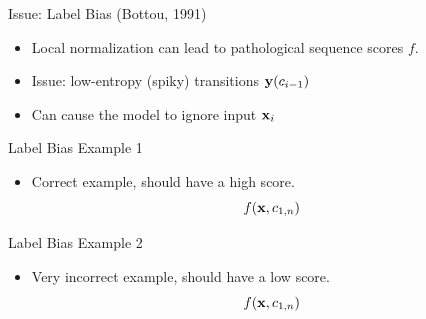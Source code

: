 \documentclass{beamer}
\def\LatticeB{
    \matrix (network)
    [matrix of nodes,
    nodes in empty cells,
    ampersand replacement=\&,
    column sep={1cm},
    row sep={0.1cm},
    nodes={outer sep=0pt,circle,minimum size=0.5cm, minimum width=1.3cm,draw, rectangle} ]
    {
     O \& O \& O \& O \& O\\
     I-PER \& I-PER \& I-PER \& I-PER \& I-PER \\ 
     I-ORG \& I-ORG \& I-ORG \& I-ORG \& I-ORG \\ 
     I-LOC \& I-LOC \& I-LOC \& I-LOC \& I-LOC \\ 
     |[draw=none]| \\
     |[draw=none]| The \& |[draw=none]| United \& |[draw=none]| Nations \& |[draw=none]| will  \& |[draw=none]| meet  \\  
};
}
\begin{document}
\begin{frame}{Issue: Label Bias (Bottou, 1991)}
  \begin{itemize}
   \item Local normalization can lead to pathological sequence
    scores $f$.
    \air 

  \item Issue: low-entropy (spiky) transitions $\mathbf{y}(c_{i-1})$
    \air 

  \item Can cause the model to ignore input $\mathbf{x}_i$
  \end{itemize}
\end{frame}


\begin{frame}{Label Bias Example 1}
  \begin{itemize}
  \item Correct example, should have a high score.
    \[ f(\mathbf{x}, c_{1,n}) \] 
  \end{itemize}
\end{frame}


\begin{frame}{Label Bias Example 2}
  \begin{itemize}
  \item Very incorrect example, should have a low score.
    \[ f(\mathbf{x}, c_{1,n}) \] 
  \end{itemize}
\end{frame}
\end{document}
